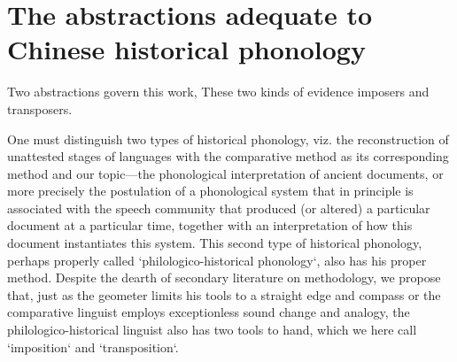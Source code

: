 

\chapter{The abstractions adequate to Chinese historical phonology}
Two abstractions govern this work, 
These two kinds of evidence imposers and transposers. 

One must distinguish two types of historical phonology, viz. the reconstruction of unattested stages of languages with the comparative method as its corresponding method and our topic—the phonological interpretation of ancient documents, or more precisely the postulation of a phonological system that in principle is associated with the speech community that produced (or altered) a particular document at a particular time, together with an interpretation of how this document instantiates this system. This second type of historical phonology, perhaps properly called `philologico-historical phonology`, also has his proper method.  Despite the dearth of secondary literature on methodology, we propose that, just as the geometer limits his tools to a straight edge and compass or the comparative linguist employs exceptionless sound change and analogy, the philologico-historical linguist also has two tools to hand, which we here call `imposition` and `transposition`. 

